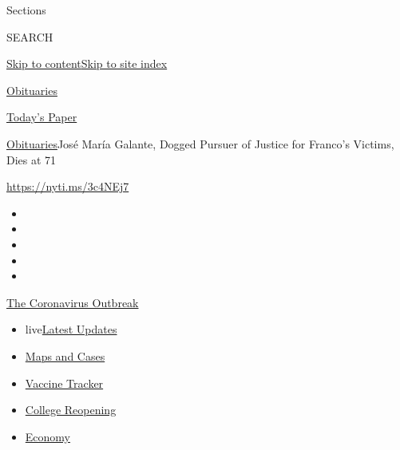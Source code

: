 Sections

SEARCH

\protect\hyperlink{site-content}{Skip to
content}\protect\hyperlink{site-index}{Skip to site index}

\href{https://www.nytimes3xbfgragh.onion/section/obituaries}{Obituaries}

\href{https://myaccount.nytimes3xbfgragh.onion/auth/login?response_type=cookie\&client_id=vi}{}

\href{https://www.nytimes3xbfgragh.onion/section/todayspaper}{Today's
Paper}

\href{/section/obituaries}{Obituaries}\textbar{}José María Galante,
Dogged Pursuer of Justice for Franco's Victims, Dies at 71

\url{https://nyti.ms/3c4NEj7}

\begin{itemize}
\item
\item
\item
\item
\item
\end{itemize}

\href{https://www.nytimes3xbfgragh.onion/news-event/coronavirus?action=click\&pgtype=Article\&state=default\&region=TOP_BANNER\&context=storylines_menu}{The
Coronavirus Outbreak}

\begin{itemize}
\tightlist
\item
  live\href{https://www.nytimes3xbfgragh.onion/2020/08/04/world/coronavirus-covid-19.html?action=click\&pgtype=Article\&state=default\&region=TOP_BANNER\&context=storylines_menu}{Latest
  Updates}
\item
  \href{https://www.nytimes3xbfgragh.onion/interactive/2020/us/coronavirus-us-cases.html?action=click\&pgtype=Article\&state=default\&region=TOP_BANNER\&context=storylines_menu}{Maps
  and Cases}
\item
  \href{https://www.nytimes3xbfgragh.onion/interactive/2020/science/coronavirus-vaccine-tracker.html?action=click\&pgtype=Article\&state=default\&region=TOP_BANNER\&context=storylines_menu}{Vaccine
  Tracker}
\item
  \href{https://www.nytimes3xbfgragh.onion/2020/08/02/us/covid-college-reopening.html?action=click\&pgtype=Article\&state=default\&region=TOP_BANNER\&context=storylines_menu}{College
  Reopening}
\item
  \href{https://www.nytimes3xbfgragh.onion/live/2020/08/03/business/stock-market-today-coronavirus?action=click\&pgtype=Article\&state=default\&region=TOP_BANNER\&context=storylines_menu}{Economy}
\end{itemize}

